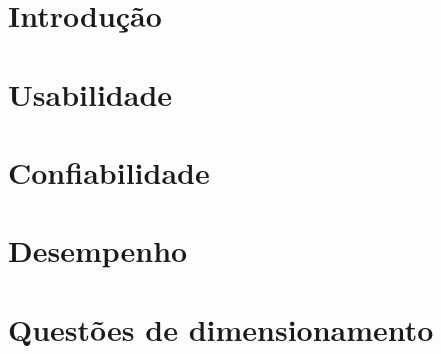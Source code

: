 \section{Introdução} %
\label{sec:introdu_o}
 

\section{Usabilidade} %
\label{sec:usabilidade}
 

\section{Confiabilidade} %
\label{sec:confiabilidade}
 

\section{Desempenho} %
\label{sec:desempenho}
 

\section{Questões de dimensionamento} %
\label{sec:questoes_de_dimensionamento}
 
